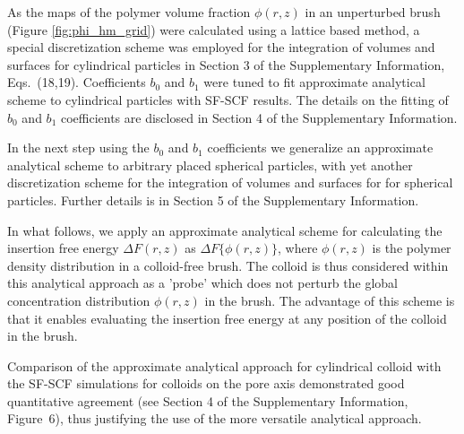 \documentclass[12pt, a4paper]{article}
\begin{document}
As the maps of the polymer volume fraction $\phi(r,z)$ in an unperturbed brush (Figure \ref{fig:phi_hm_grid}) were calculated using a lattice based method, a special discretization scheme was employed for the integration of volumes and surfaces for cylindrical particles in
Section 3 of the Supplementary Information, Eqs.~(18,19).
Coefficients $b_0$ and $b_1$ were tuned to fit approximate analytical scheme to cylindrical particles with SF-SCF results.
The details on the fitting of $b_0$ and $b_1$ coefficients are disclosed in Section 4 of the Supplementary Information.

In the next step using the $b_0$ and $b_1$ coefficients we generalize an approximate analytical scheme to arbitrary placed spherical particles, with yet another discretization scheme for the integration of volumes and surfaces for for spherical particles.
Further details is in Section 5 of the Supplementary Information.

In what follows, we apply an approximate analytical scheme for calculating the insertion free energy $\Delta F(r,z)$ as $\Delta F\{\phi(r,z)\}$, 
where $\phi(r,z)$ is the polymer density distribution in a colloid-free brush. 
The colloid is thus considered within this analytical approach as a 'probe' which does not perturb the global concentration distribution $\phi(r,z)$ in the brush. 
The advantage of this scheme is that it enables evaluating the insertion free energy at any position of the colloid in the brush.

Comparison of the approximate analytical approach for cylindrical colloid with the SF-SCF simulations for colloids on the pore axis demonstrated good quantitative agreement (see Section 4 of the Supplementary Information, Figure~6), 
thus justifying the use of the more versatile analytical approach.
\end{document}
